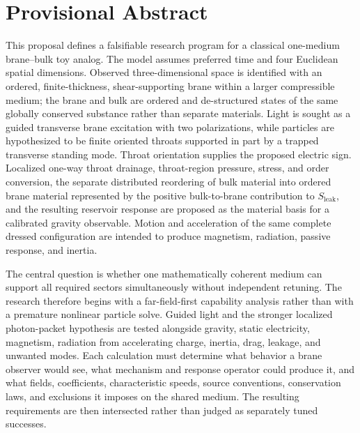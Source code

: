 
\chapter*{Provisional Abstract}
\label{ch:provisional-abstract}

This proposal defines a falsifiable research program for a classical
one-medium brane--bulk toy analog. The model assumes preferred time and four
Euclidean spatial dimensions. Observed three-dimensional space is identified
with an ordered, finite-thickness, shear-supporting brane within a larger
compressible medium; the brane and bulk are ordered and de-structured states of
the same globally conserved substance rather than separate materials. Light is
sought as a guided transverse brane excitation with two polarizations, while
particles are hypothesized to be finite oriented throats supported in part by a
trapped transverse standing mode. Throat orientation supplies the proposed
electric sign. Localized one-way throat drainage, throat-region pressure,
stress, and order conversion, the separate distributed reordering of bulk
material into ordered brane material represented by the positive bulk-to-brane
contribution to \(S_{\mathrm{leak}}\), and the resulting reservoir response are
proposed as the material basis for a calibrated gravity observable. Motion and
acceleration of the same complete dressed configuration are intended to produce
magnetism, radiation, passive response, and inertia.

The central question is whether one mathematically coherent medium can support
all required sectors simultaneously without independent retuning. The research
therefore begins with a far-field-first capability analysis rather than with a
premature nonlinear particle solve. Guided light and the stronger localized
photon-packet hypothesis are tested alongside gravity, static electricity,
magnetism, radiation from accelerating charge, inertia, drag, leakage, and unwanted
modes. Each calculation must determine what behavior a brane observer would
see, what mechanism and response operator could produce it, and what fields,
coefficients, characteristic speeds, source conventions, conservation laws,
and exclusions it imposes on the shared medium. The resulting requirements are
then intersected rather than judged as separately tuned successes.


